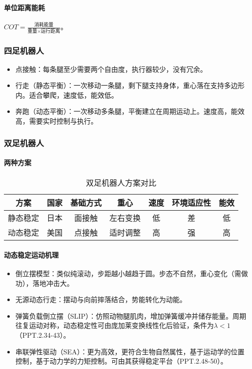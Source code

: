 \documentclass[
12pt, %
a4paper, 
oneside, %
headinclude,footinclude, %
]{scrartcl}
\begin{document}
\paragraph{单位距离能耗}
$ COT = \frac{\text{消耗能量}}{\text{重量} \times \text{运行距离}} $。
\subsubsection[四足机器人]{四足机器人}
\begin{itemize}
\item 点接触：每条腿至少需要两个自由度，执行器较少，没有冗余。
\item 行走（静态平衡）：一次移动一条腿，剩下腿支持身体，重心落在支持多边形内。适合攀爬，速度低，能效低。
\item 奔跑（动态平衡）：一次移动多条腿，平衡建立在周期运动上。速度高，能效高，需要实时控制与执行。
\end{itemize}
\subsubsection[双足机器人]{双足机器人}
\paragraph{两种方案}
\begin{table}[H]
\centering
\caption{双足机器人方案对比}
\begin{tabular}{|c|c|c|c|c|c|c|}
\hline
方案 & 国家 & 基础方式 & 重心 & 速度 & 环境适应性 & 能效 \\
\hline
静态稳定 & 日本 & 面接触 & 左右变换 & 低 & 差 & 低 \\
\hline
动态稳定 & 美国 & 点接触 & 适时调整 & 高 & 强 & 高 \\
\hline
\end{tabular}
\end{table}
\paragraph{动态稳定运动机理}
\begin{itemize}
\item 倒立摆模型：类似纯滚动，步距越小越趋于圆。步态不自然，重心变化（需做功），落地冲击大。
\item 无源动态行走：摆动与向前摔落结合，势能转化为动能。
\item 弹簧负载倒立摆（SLIP）：仿照动物腿肌肉，增加弹簧缓冲并储存能量。周期往复运动对称，动态稳定性可由庞加莱变换线性化后验证，条件为$ \lambda < 1 $（PPT.2.34-43）。
\item 串联弹性驱动（SEA）：更为高效，更符合生物自然属性，基于运动学的位置控制，基于动力学的力矩控制。可由其获得稳定平台（PPT.2.48-50）。
\end{itemize}
\end{document}
